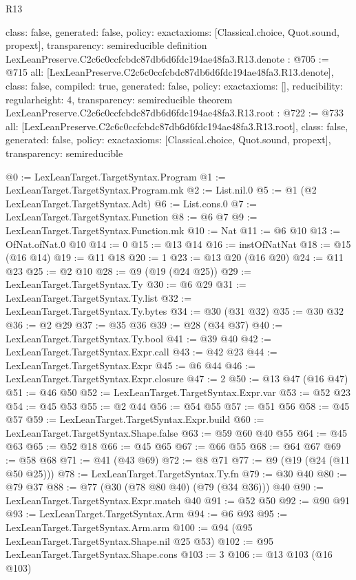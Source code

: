 \begin{lexlean}{R13}
\begin{coremodule}
{  class: false,
  generated: false,
  policy: exact{axioms: [Classical.choice, Quot.sound, propext]},
  transparency: semireducible
}
definition LexLeanPreserve.C2c6c0ccfcbdc87db6d6fdc194ae48fa3.R13.denote : @705 := @715 {
  all: [LexLeanPreserve.C2c6c0ccfcbdc87db6d6fdc194ae48fa3.R13.denote],
  class: false,
  compiled: true,
  generated: false,
  policy: exact{axioms: []},
  reducibility: regular{height: 4},
  transparency: semireducible
}
theorem LexLeanPreserve.C2c6c0ccfcbdc87db6d6fdc194ae48fa3.R13.root : @722 := @733 {
  all: [LexLeanPreserve.C2c6c0ccfcbdc87db6d6fdc194ae48fa3.R13.root],
  class: false,
  generated: false,
  policy: exact{axioms: [Classical.choice, Quot.sound, propext]},
  transparency: semireducible
}

@0 := LexLeanTarget.TargetSyntax.Program
@1 := LexLeanTarget.TargetSyntax.Program.mk
@2 := List.nil.{0}
@5 := @1 (@2 LexLeanTarget.TargetSyntax.Adt)
@6 := List.cons.{0}
@7 := LexLeanTarget.TargetSyntax.Function
@8 := @6 @7
@9 := LexLeanTarget.TargetSyntax.Function.mk
@10 := Nat
@11 := @6 @10
@13 := OfNat.ofNat.{0} @10
@14 := 0
@15 := @13 @14
@16 := instOfNatNat
@18 := @15 (@16 @14)
@19 := @11 @18
@20 := 1
@23 := @13 @20 (@16 @20)
@24 := @11 @23
@25 := @2 @10
@28 := @9 (@19 (@24 @25))
@29 := LexLeanTarget.TargetSyntax.Ty
@30 := @6 @29
@31 := LexLeanTarget.TargetSyntax.Ty.list
@32 := LexLeanTarget.TargetSyntax.Ty.bytes
@34 := @30 (@31 @32)
@35 := @30 @32
@36 := @2 @29
@37 := @35 @36
@39 := @28 (@34 @37)
@40 := LexLeanTarget.TargetSyntax.Ty.bool
@41 := @39 @40
@42 := LexLeanTarget.TargetSyntax.Expr.call
@43 := @42 @23
@44 := LexLeanTarget.TargetSyntax.Expr
@45 := @6 @44
@46 := LexLeanTarget.TargetSyntax.Expr.closure
@47 := 2
@50 := @13 @47 (@16 @47)
@51 := @46 @50
@52 := LexLeanTarget.TargetSyntax.Expr.var
@53 := @52 @23
@54 := @45 @53
@55 := @2 @44
@56 := @54 @55
@57 := @51 @56
@58 := @45 @57
@59 := LexLeanTarget.TargetSyntax.Expr.build
@60 := LexLeanTarget.TargetSyntax.Shape.false
@63 := @59 @60 @40 @55
@64 := @45 @63
@65 := @52 @18
@66 := @45 @65
@67 := @66 @55
@68 := @64 @67
@69 := @58 @68
@71 := @41 (@43 @69)
@72 := @8 @71
@77 := @9 (@19 (@24 (@11 @50 @25)))
@78 := LexLeanTarget.TargetSyntax.Ty.fn
@79 := @30 @40
@80 := @79 @37
@88 := @77 (@30 (@78 @80 @40) (@79 (@34 @36))) @40
@90 := LexLeanTarget.TargetSyntax.Expr.match @40
@91 := @52 @50
@92 := @90 @91
@93 := LexLeanTarget.TargetSyntax.Arm
@94 := @6 @93
@95 := LexLeanTarget.TargetSyntax.Arm.arm
@100 := @94 (@95 LexLeanTarget.TargetSyntax.Shape.nil @25 @53)
@102 := @95 LexLeanTarget.TargetSyntax.Shape.cons
@103 := 3
@106 := @13 @103 (@16 @103)

\end{coremodule}
\end{lexlean}
